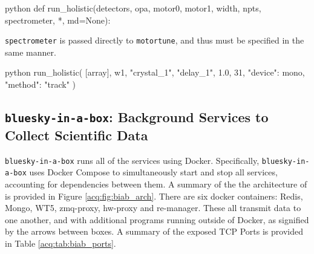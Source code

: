 \begin{codefragment}{python}
def run_holistic(detectors, opa, motor0, motor1, width, npts, spectrometer, *, md=None):
\end{codefragment}

\texttt{spectrometer} is passed directly to \texttt{motortune}, and thus must be specified in the same manner.

\begin{codefragment}{python}
run_holistic(
    [array],
    w1,
    "crystal_1",
    "delay_1",
    1.0,
    31,
    {"device": mono, "method": "track"}
)
\end{codefragment}


\subsection{\texttt{bluesky-in-a-box}: Background Services to Collect Scientific Data}

\texttt{bluesky-in-a-box} runs all of the services using Docker\cite{merkel2014docker}\cite{dockerdocs}.
Specifically, \texttt{bluesky-in-a-box} uses Docker Compose\cite{dockercompose} to simultaneously start and stop all services, accounting for dependencies between them.
A summary of the the architecture of \biab{} is provided in Figure \ref{acq:fig:biab_arch}.
There are six docker containers: Redis, Mongo, WT5, zmq-proxy, hw-proxy and re-manager.
These all transmit data to one another, and with additional programs running outside of Docker, as signified by the arrows between boxes.
A summary of the exposed TCP Ports is provided in Table \ref{acq:tab:biab_ports}.

